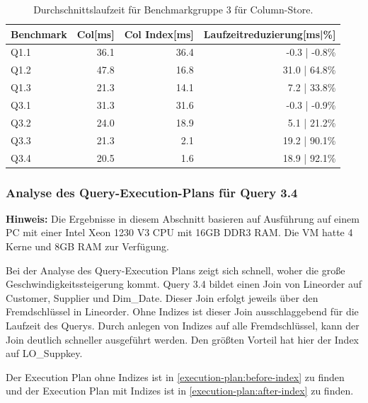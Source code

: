 \begin{table}[H]
    \centering
    \begin{tabularx}{13cm}{lrrr}
        \toprule
        Benchmark           & Col[ms]       & Col Index[ms] & Laufzeitreduzierung[ms|\%]   \\
        \toprule
        Q1.1                & 36.1          & 36.4          & -0.3 | -0.8\%                \\
        Q1.2                & 47.8          & 16.8          & 31.0 | 64.8\%                 \\
        Q1.3                & 21.3          & 14.1          & 7.2 | 33.8\%                \\
        Q3.1                & 31.3          & 31.6          & -0.3 | -0.9\%                \\
        Q3.2                & 24.0          & 18.9          & 5.1 | 21.2\%                 \\
        Q3.3                & 21.3          & 2.1           & 19.2 | 90.1\%                \\
        Q3.4                & 20.5          & 1.6           & 18.9 | 92.1\%                \\
        \bottomrule
    \end{tabularx}
\caption{Durchschnittslaufzeit für Benchmarkgruppe 3 für Column-Store.}
\end{table}

\subsubsection{Analyse des Query-Execution-Plans für Query 3.4}
\textbf{Hinweis:} Die Ergebnisse in diesem Abschnitt basieren auf Ausführung auf einem PC mit einer Intel Xeon 1230 V3 CPU mit 16GB DDR3 RAM. Die VM hatte 4 Kerne und 8GB RAM zur Verfügung.

Bei der Analyse des Query-Execution Plans zeigt sich schnell,
woher die große Geschwindigkeitssteigerung kommt.
Query 3.4 bildet einen Join von Lineorder auf Customer,
Supplier und Dim\_Date. 
Dieser Join erfolgt jeweils über den Fremdschlüssel in Lineorder.
Ohne Indizes ist dieser Join ausschlaggebend für die Laufzeit des Querys.
Durch anlegen von Indizes auf alle Fremdschlüssel,
kann der Join deutlich schneller ausgeführt werden.
Den größten Vorteil hat hier der Index auf LO\_Suppkey.

Der Execution Plan ohne Indizes ist in \autoref{execution-plan:before-index}
zu finden und der Execution Plan mit Indizes ist in \autoref{execution-plan:after-index} zu finden.

